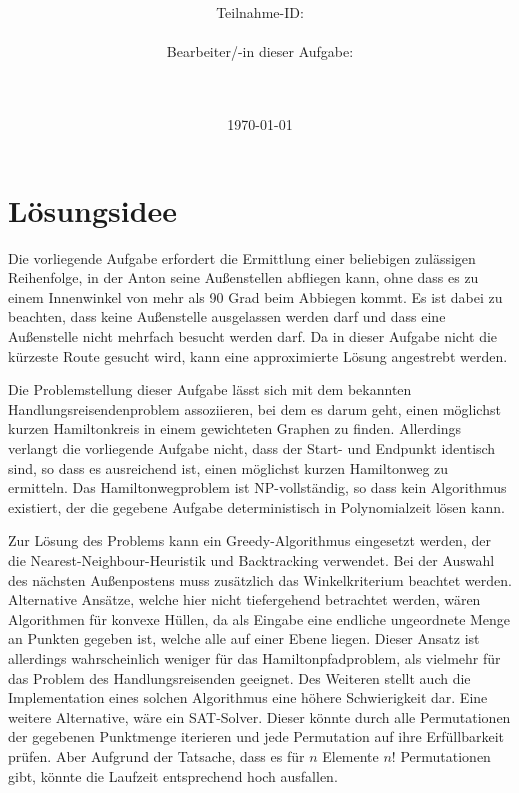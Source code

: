 \documentclass[a4paper,10pt,ngerman]{scrartcl}
\title{\textbf{\Huge\Aufgabe}}
\author{\LARGE Teilnahme-ID: \LARGE \TeilnahmeId \\\\
\LARGE Bearbeiter/-in dieser Aufgabe: \\
\LARGE \Name\\\\}
\date{\LARGE\today}
\begin{document}
    \maketitle
    \tableofcontents
    \vspace{0.5cm}
    \newpage


    \section{Lösungsidee}\label{sec:losungsidee}

    Die vorliegende Aufgabe erfordert die Ermittlung einer beliebigen zulässigen Reihenfolge,
    in der Anton seine Außenstellen abfliegen kann,
    ohne dass es zu einem Innenwinkel von mehr als 90 Grad beim Abbiegen kommt.
    Es ist dabei zu beachten, dass keine Außenstelle ausgelassen werden darf
    und dass eine Außenstelle nicht mehrfach besucht werden darf.
    Da in dieser Aufgabe nicht die kürzeste Route gesucht wird, kann eine approximierte Lösung angestrebt werden.

    Die Problemstellung dieser Aufgabe lässt sich mit dem bekannten Handlungsreisendenproblem assoziieren,
    bei dem es darum geht, einen möglichst kurzen Hamiltonkreis in einem gewichteten Graphen zu finden.
    Allerdings verlangt die vorliegende Aufgabe nicht, dass der Start- und Endpunkt identisch sind,
    so dass es ausreichend ist, einen möglichst kurzen Hamiltonweg zu ermitteln.
    Das Hamiltonwegproblem ist NP-vollständig, so dass kein Algorithmus existiert,
    der die gegebene Aufgabe deterministisch in Polynomialzeit lösen kann.

    Zur Lösung des Problems kann ein Greedy-Algorithmus eingesetzt werden,
    der die Nearest-Neighbour-Heuristik und Backtracking verwendet.
    Bei der Auswahl des nächsten Außenpostens muss zusätzlich das Winkelkriterium beachtet werden.
    Alternative Ansätze, welche hier nicht tiefergehend betrachtet werden, wären Algorithmen für konvexe Hüllen,
    da als Eingabe eine endliche ungeordnete Menge an Punkten gegeben ist, welche alle auf einer Ebene liegen.
    Dieser Ansatz ist allerdings wahrscheinlich weniger für das Hamiltonpfadproblem,
    als vielmehr für das Problem des Handlungsreisenden geeignet.
    Des Weiteren stellt auch die Implementation eines solchen Algorithmus eine höhere Schwierigkeit dar.
    Eine weitere Alternative, wäre ein SAT-Solver.
    Dieser könnte durch alle Permutationen der gegebenen Punktmenge iterieren
    und jede Permutation auf ihre Erfüllbarkeit prüfen.
    Aber Aufgrund der Tatsache, dass es für $n$ Elemente $n!$ Permutationen gibt,
    könnte die Laufzeit entsprechend hoch ausfallen.
\end{document}
